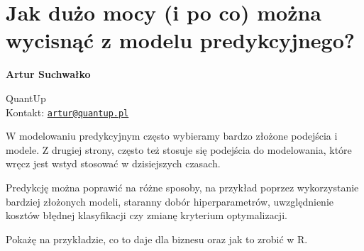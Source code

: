 \documentclass[\main/boa.tex]{subfiles}
\begin{document}
\section{Jak dużo mocy (i po co) można wycisnąć z modelu predykcyjnego?}


\begin{minipage}{0.915\textwidth}
	\centering
  {\bf \huge {} Artur Suchwałko}
\end{minipage}


\vskip 0.3cm

\begin{affiliations}
\begin{minipage}{0.915\textwidth}
\centering
\large QuantUp \\[5pt]
Kontakt: \href{mailto:artur@quantup.pl}{\nolinkurl{artur@quantup.pl}}\\
\end{minipage}
\end{affiliations}

\vskip 0.8cm

W modelowaniu predykcyjnym często wybieramy bardzo złożone podejścia i modele. Z drugiej strony, często też stosuje się podejścia do modelowania, które wręcz jest wstyd stosować w dzisiejszych czasach.

Predykcję można poprawić na różne sposoby, na przykład poprzez wykorzystanie bardziej złożonych modeli, staranny dobór hiperparametrów, uwzględnienie kosztów błędnej klasyfikacji czy zmianę kryterium optymalizacji.

Pokażę na przykładzie, co to daje dla biznesu oraz jak to zrobić w R.
\end{document}
